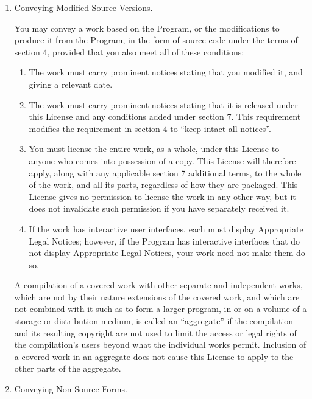 \documentclass{article}
\begin{document}
\begin{enumerate}[\hspace{-18pt}1.]
\item Conveying Modified Source Versions. 

You may convey a work based on the Program, or the modifications to produce it from the Program, in the form of source code under the terms of section 4, provided that you also meet all of these conditions:
\begin{enumerate}
  \item The work must carry prominent notices stating that you modified it, and giving a relevant date.
  \item The work must carry prominent notices stating that it is released under this License and any conditions added under section 7.  This requirement modifies the requirement in section 4 to ``keep intact all notices''.
  \item You must license the entire work, as a whole, under this License to anyone who comes into possession of a copy.  This License will therefore apply, along with any applicable section 7 additional terms, to the whole of the work, and all its parts, regardless of how they are packaged. This License gives no permission to license the work in any other way, but it does not invalidate such permission if you have separately received it.
  \item If the work has interactive user interfaces, each must display Appropriate Legal Notices; however, if the Program has interactive interfaces that do not display Appropriate Legal Notices, your work need not make them do so.
\end{enumerate}
A compilation of a covered work with other separate and independent works, which are not by their nature extensions of the covered work, and which are not combined with it such as to form a larger program, in or on a volume of a storage or distribution medium, is called an ``aggregate'' if the compilation and its resulting copyright are not used to limit the access or legal rights of the compilation's users beyond what the individual works permit.  Inclusion of a covered work in an aggregate does not cause this License to apply to the other parts of the aggregate.

\item Conveying Non-Source Forms. 


\end{enumerate}
\end{document}
